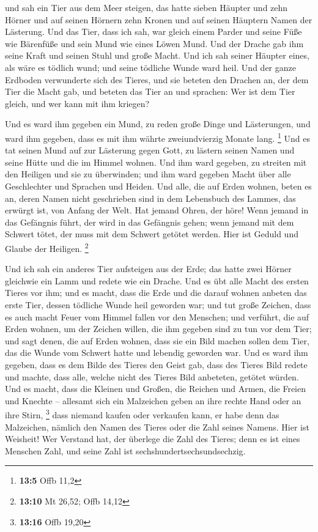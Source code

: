  und sah ein Tier aus dem Meer steigen, das hatte sieben
Häupter und zehn Hörner und auf seinen Hörnern zehn Kronen und auf
seinen Häuptern Namen der Lästerung.  Und das Tier, dass
ich sah, war gleich einem Parder und seine Füße wie Bärenfüße und sein
Mund wie eines Löwen Mund. Und der Drache gab ihm seine Kraft und seinen
Stuhl und große Macht.  Und ich sah seiner Häupter eines,
als wäre es tödlich wund; und seine tödliche Wunde ward heil. Und der
ganze Erdboden verwunderte sich des Tieres,  und sie
beteten den Drachen an, der dem Tier die Macht gab, und beteten das Tier
an und sprachen: Wer ist dem Tier gleich, und wer kann mit ihm kriegen?

 Und es ward ihm gegeben ein Mund, zu reden große Dinge
und Lästerungen, und ward ihm gegeben, dass es mit ihm währte
zweiundvierzig Monate lang. \footnote{\textbf{13:5} Offb 11,2}
 Und es tat seinen Mund auf zur Lästerung gegen Gott, zu
lästern seinen Namen und seine Hütte und die im Himmel wohnen.
 Und ihm ward gegeben, zu streiten mit den Heiligen und
sie zu überwinden; und ihm ward gegeben Macht über alle Geschlechter und
Sprachen und Heiden.  Und alle, die auf Erden wohnen,
beten es an, deren Namen nicht geschrieben sind in dem Lebensbuch des
Lammes, das erwürgt ist, von Anfang der Welt.  Hat jemand
Ohren, der höre!  Wenn jemand in das Gefängnis führt, der
wird in das Gefängnis gehen; wenn jemand mit dem Schwert tötet, der muss
mit dem Schwert getötet werden. Hier ist Geduld und Glaube der Heiligen.
\footnote{\textbf{13:10} Mt 26,52; Offb 14,12}

 Und ich sah ein anderes Tier aufsteigen aus der Erde;
das hatte zwei Hörner gleichwie ein Lamm und redete wie ein Drache.
 Und es übt alle Macht des ersten Tieres vor ihm; und es
macht, dass die Erde und die darauf wohnen anbeten das erste Tier,
dessen tödliche Wunde heil geworden war;  und tut große
Zeichen, dass es auch macht Feuer vom Himmel fallen vor den Menschen;
 und verführt, die auf Erden wohnen, um der Zeichen
willen, die ihm gegeben sind zu tun vor dem Tier; und sagt denen, die
auf Erden wohnen, dass sie ein Bild machen sollen dem Tier, das die
Wunde vom Schwert hatte und lebendig geworden war.  Und
es ward ihm gegeben, dass es dem Bilde des Tieres den Geist gab, dass
des Tieres Bild redete und machte, dass alle, welche nicht des Tieres
Bild anbeteten, getötet würden.  Und es macht, dass die
Kleinen und Großen, die Reichen und Armen, die Freien und Knechte --
allesamt sich ein Malzeichen geben an ihre rechte Hand oder an ihre
Stirn, \footnote{\textbf{13:16} Offb 19,20}  dass niemand
kaufen oder verkaufen kann, er habe denn das Malzeichen, nämlich den
Namen des Tieres oder die Zahl seines Namens.  Hier ist
Weisheit! Wer Verstand hat, der überlege die Zahl des Tieres; denn es
ist eines Menschen Zahl, und seine Zahl ist sechshundertsechsundsechzig.


